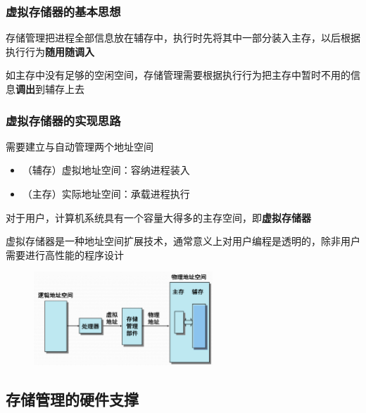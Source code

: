 \documentclass[cs4size,a4paper,10pt]{ctexart}
\begin{document}
	\subsubsection{虚拟存储器的基本思想}
	存储管理把进程全部信息放在辅存中，执行时先将其中一部分装入主存，以后根据执行行为\textbf{随用随调入}

	如主存中没有足够的空闲空间，存储管理需要根据执行行为把主存中暂时不用的信息\textbf{调出}到辅存上去


	\subsubsection{虚拟存储器的实现思路}
	需要建立与自动管理两个地址空间
	\begin{itemize}
		\item （辅存）虚拟地址空间：容纳进程装入
		\item （主存）实际地址空间：承载进程执行
	\end{itemize}
	对于用户，计算机系统具有一个容量大得多的主存空间，即\textbf{虚拟存储器}

	虚拟存储器是一种地址空间扩展技术，通常意义上对用户编程是透明的，除非用户需要进行高性能的程序设计
	\begin{figure}[H]
		\centering
		\includegraphics[width=0.6\textwidth]{img/3.1.3.3}
	\end{figure}

	\subsection{存储管理的硬件支撑}
\end{document}
